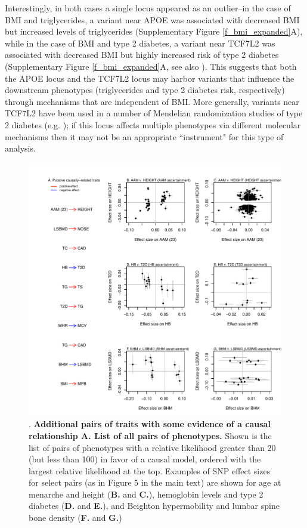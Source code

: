 \documentclass[11pt,titlepage]{article}
\begin{document}
Interestingly, in both cases a single locus appeared as an outlier--in the case of BMI and triglycerides, a variant near APOE was associated with decreased BMI but increased levels of triglycerides (Supplementary Figure \ref{f_bmi_expanded}A), while in the case of BMI and type 2 diabetes, a variant near TCF7L2 was associated with decreased BMI but highly increased risk of type 2 diabetes (Supplementary Figure \ref{f_bmi_expanded}A, see also \citet{Helgason:2007aa}). This suggests that both the APOE locus and the TCF7L2 locus may harbor variants that influence the downstream phenotypes (triglycerides and type 2 diabetes risk, respectively) through mechanisms that are independent of BMI. More generally, variants near TCF7L2 have been used in a number of Mendelian randomization studies of type 2 diabetes (e.g. \cite{Song:2012aa, Villareal:2010aa, Pfister:2011aa}); if this locus affects multiple phenotypes via different molecular mechanisms then it may not be an appropriate ``instrument" for this type of analysis. 


\begin{figure}
\begin{center}
\includegraphics[scale = 0.8]{figs/causal_supp.pdf}
\caption{. \textbf{Additional pairs of traits with some evidence of a causal relationship A. List of all pairs of phenotypes.} Shown is the list of pairs of phenotypes with a relative likelihood greater than 20 (but less than 100) in favor of a causal model, ordered with the largest relative likelihood at the top. Examples of SNP effect sizes for select pairs (as in Figure 5 in the main text) are shown for age at menarche and height (\textbf{B.} and \textbf{C.}), hemoglobin levels and type 2 diabetes (\textbf{D.} and \textbf{E.}), and Beighton hypermobility and lumbar spine bone density (\textbf{F.} and \textbf{G.}) }\label{f_causal_supp}
\end{center}
\end{figure}
\end{document}
